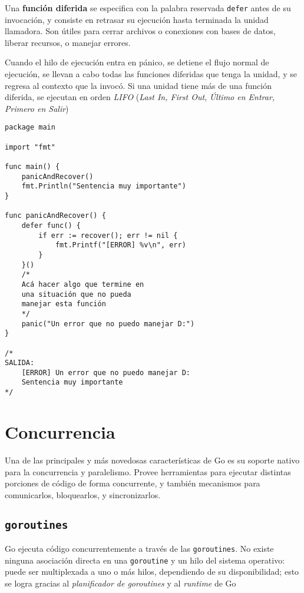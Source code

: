 Una \textbf{función diferida} se especifica con la palabra reservada \texttt{defer} antes de su invocación, y consiste en retrasar su ejecución hasta terminada la unidad llamadora. Son útiles para cerrar archivos o conexiones con bases de datos, liberar recursos, o manejar errores.

Cuando el hilo de ejecución entra en pánico, se detiene el flujo normal de ejecución, se llevan a cabo todas las funciones diferidas que tenga la unidad, y se regresa al contexto que la invocó. Si una unidad tiene más de una función diferida, se ejecutan en orden \emph{LIFO} (\emph{Last In, First Out}, \emph{Último en Entrar, Primero en Salir}) 

\begin{lstlisting}[title={\emph{Defer, Panic, Recover} \autocite{MediumDeferPanicRecover}}]
package main

import "fmt"

func main() {
    panicAndRecover()
    fmt.Println("Sentencia muy importante")
}

func panicAndRecover() {
    defer func() {
        if err := recover(); err != nil {
            fmt.Printf("[ERROR] %v\n", err)
        }
    }()
    /*
    Acá hacer algo que termine en 
    una situación que no pueda
    manejar esta función
    */
    panic("Un error que no puedo manejar D:")
}

/*
SALIDA:
    [ERROR] Un error que no puedo manejar D:
    Sentencia muy importante
*/
\end{lstlisting}

\section{Concurrencia}

Una de las principales y más novedosas características de Go es su soporte nativo para la concurrencia y paralelismo. Provee herramientas para ejecutar distintas porciones de código de forma concurrente, y también mecanismos para comunicarlos, bloquearlos, y sincronizarlos.

\subsection{\texttt{goroutines}}

Go ejecuta código concurrentemente a través de las \texttt{goroutines}. No existe ninguna asociación directa en una \texttt{goroutine} y un hilo del sistema operativo: puede ser multiplexada a uno o más hilos, dependiendo de su disponibilidad; esto se logra gracias al \emph{planificador de goroutines} y al \emph{runtime} de Go \autocite{TheWayToGo:Goroutines}    

